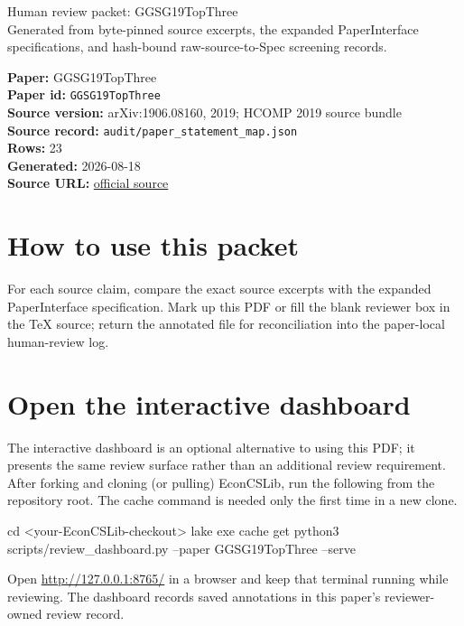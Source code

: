 \documentclass[10pt]{article}
\begin{document}
\fontsize{9}{10}\selectfont

\begin{center}
{\LARGE Human review packet: GGSG19TopThree}\\[0.35em]
\small Generated from byte-pinned source excerpts, the expanded PaperInterface
specifications, and hash-bound raw-source-to-Spec screening records.
\end{center}

\noindent\textbf{Paper:} GGSG19TopThree\\
\textbf{Paper id:} \texttt{GGSG19TopThree}\\
\textbf{Source version:} arXiv:1906.08160, 2019; HCOMP 2019 source bundle\\
\textbf{Source record:} \texttt{audit/paper\_statement\_map.json}\\
\textbf{Rows:} 23\\
\textbf{Generated:} 2026-08-18\\
\textbf{Source URL:} \href{https://arxiv.org/pdf/1906.08160}{official source}

\noindent{}\par



\section*{How to use this packet}
For each source claim, compare the exact source excerpts with the expanded
PaperInterface specification. Mark up this PDF or fill the blank reviewer box in the TeX source;
return the annotated file for reconciliation into the paper-local human-review
log.

\section*{Open the interactive dashboard}
The interactive dashboard is an optional alternative to using this PDF; it
presents the same review surface rather than an additional review requirement.
After forking and cloning (or pulling) EconCSLib, run the following from the
repository root. The cache command is needed only the first time in a new clone.
\begin{ReviewVerbatim}
cd <your-EconCSLib-checkout>
lake exe cache get
python3 scripts/review_dashboard.py --paper GGSG19TopThree --serve
\end{ReviewVerbatim}
Open \url{http://127.0.0.1:8765/} in a browser and keep that terminal running
while reviewing. The dashboard records saved annotations in this paper's
reviewer-owned review record.
\end{document}

